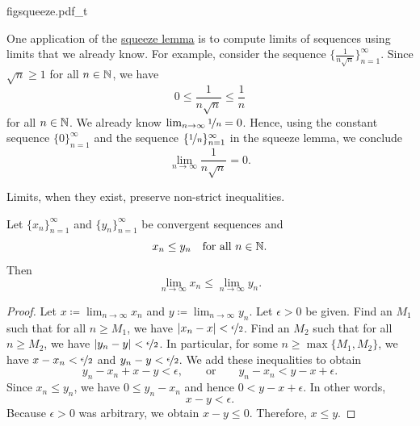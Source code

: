 \begin{myfigureht}
{figsqueeze.pdf_t}
\caption{Squeeze lemma proof in picture.\label{figsqueeze}}
\end{myfigureht}

\begin{example}
One application of
the \hyperref[squeeze:lemma]{squeeze lemma} is to compute limits of 
sequences using limits that we already know.  For example, consider
the sequence $\{ \frac{1}{n\sqrt{n}} \}_{n=1}^\infty$.
Since $\sqrt{n} \geq 1$ for all $n \in {\mathbb{N}}$, we have
\begin{equation*}
0 \leq \frac{1}{n\sqrt{n}} \leq \frac{1}{n}
\end{equation*}
for all $n \in {\mathbb{N}}$.  We already know $\lim_{n\to\infty} \nicefrac{1}{n} = 0$. 
Hence, using
the constant sequence $\{ 0 \}_{n=1}^\infty$ and the sequence
$\{ \nicefrac{1}{n} \}_{n=1}^\infty$ in the
squeeze lemma, we conclude
\begin{equation*}
\lim_{n\to\infty} \frac{1}{n\sqrt{n}} = 0 .
\end{equation*}
\end{example}

Limits, when they exist, preserve non-strict inequalities.

\begin{lemma} \label{limandineq:lemma}
Let $\{ x_n \}_{n=1}^\infty$ and $\{ y_n \}_{n=1}^\infty$ be
convergent sequences and
\begin{equation*}
x_n \leq y_n \quad \text{for all } n \in {\mathbb{N}} .
\end{equation*}
Then
\begin{equation*}
\lim_{n\to\infty} x_n \leq
\lim_{n\to\infty} y_n .
\end{equation*}
\end{lemma}

\begin{proof}
Let $x \coloneqq \lim_{n\to\infty} x_n$ and $y \coloneqq \lim_{n\to\infty} y_n$. 
Let 
$\epsilon > 0$ be given.  Find an $M_1$ such that for all $n \geq M_1$,
we have $\left\lvert {x_n-x} \right\rvert < \nicefrac{\epsilon}{2}$.  Find an $M_2$ such that
for all $n \geq M_2$, we have
$\left\lvert {y_n-y} \right\rvert < \nicefrac{\epsilon}{2}$.  In particular,
for some $n \geq \max\{ M_1, M_2 \}$, we have
$x-x_n < \nicefrac{\epsilon}{2}$ and
$y_n-y < \nicefrac{\epsilon}{2}$.  We add these inequalities to
obtain
\begin{equation*}
y_n-x_n+x-y < \epsilon, \qquad \text{or} \qquad
y_n-x_n < y-x+ \epsilon .
\end{equation*}
Since $x_n \leq y_n$, we have
$0 \leq y_n-x_n$ and hence $0 < y-x+ \epsilon$.
In other words,
\begin{equation*}
x-y < \epsilon .
\end{equation*}
Because $\epsilon > 0$ was arbitrary, we obtain
$x-y \leq 0$.
Therefore, $x \leq y$.
\end{proof}

